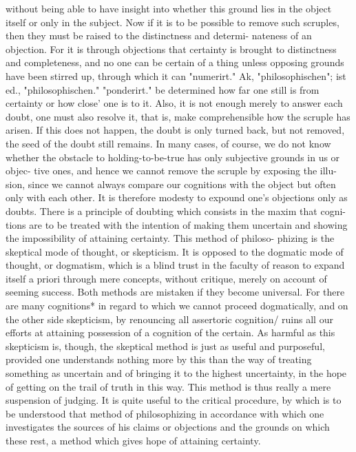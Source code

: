 without being able to have insight into whether this ground lies in the
object itself or only in the subject. Now if it is to be possible to remove
such scruples, then they must be raised to the distinctness and determi-
nateness of an objection. For it is through objections that certainty is
brought to distinctness and completeness, and no one can be certain of a
thing unless opposing grounds have been stirred up, through which it can
"numerirt."
Ak, "philosophischen"; ist ed., "philosophischen."
"ponderirt."
be determined how far one still is from certainty or how close' one is to it.
Also, it is not enough merely to answer each doubt, one must also resolve
it, that is, make comprehensible how the scruple has arisen. If this does
not happen, the doubt is only turned back, but not removed, the seed of the
doubt still remains. In many cases, of course, we do not know whether the
obstacle to holding-to-be-true has only subjective grounds in us or objec-
tive ones, and hence we cannot remove the scruple by exposing the illu-
sion, since we cannot always compare our cognitions with the object but
often only with each other. It is therefore modesty to expound one's
objections only as doubts.
There is a principle of doubting which consists in the maxim that cogni-
tions are to be treated with the intention of making them uncertain and
showing the impossibility of attaining certainty. This method of philoso-
phizing is the skeptical mode of thought, or skepticism. It is opposed to the
dogmatic mode of thought, or dogmatism, which is a blind trust in the
faculty of reason to expand itself a priori through mere concepts, without
critique, merely on account of seeming success.
Both methods are mistaken if they become universal. For there are
many cognitions* in regard to which we cannot proceed dogmatically, and
on the other side skepticism, by renouncing all assertoric cognition/ ruins
all our efforts at attaining possession of a cognition of the certain.
As harmful as this skepticism is, though, the skeptical method is just as
useful and purposeful, provided one understands nothing more by this
than the way of treating something as uncertain and of bringing it to the
highest uncertainty, in the hope of getting on the trail of truth in this way.
This method is thus really a mere suspension of judging. It is quite useful
to the critical procedure, by which is to be understood that method of
philosophizing in accordance with which one investigates the sources of his
claims or objections and the grounds on which these rest, a method which
gives hope of attaining certainty.
